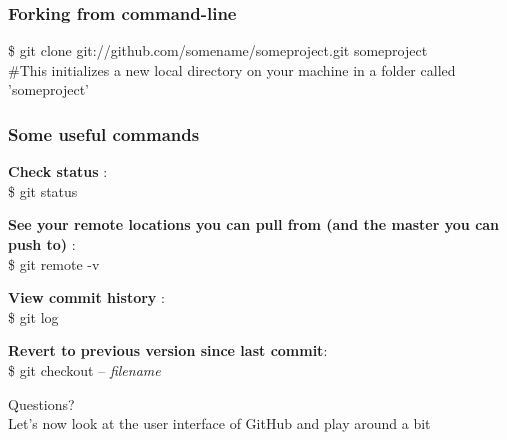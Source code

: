 \documentclass{beamer}\usepackage{graphicx, color}
\begin{document}
\begin{frame}
 \frametitle{Forking from command-line}

 \$ git clone git://github.com/somename/someproject.git someproject \\
\vspace{1cm}
\#This initializes a new local directory on your machine in a folder called 'someproject' \\

\end{frame}


\begin{frame}
 \frametitle{Some useful commands}

\textbf{Check status} : \\ \$ git status \vspace{0.5cm}

\textbf{See your remote locations you can pull from (and the master you can push to)} : \\ \$ git remote -v \vspace{0.5cm}

\textbf{View commit history} : \\ \$ git log \vspace{0.5cm}

\textbf{Revert to previous version since last commit}:  \\ \$ git checkout -- \textit{filename}

\end{frame}


\begin{frame}
 \huge Questions?  \\
\vspace{1cm}
\pause
\normalsize Let's now look at the user interface of GitHub and play around a bit 
\end{frame}
\end{document}
